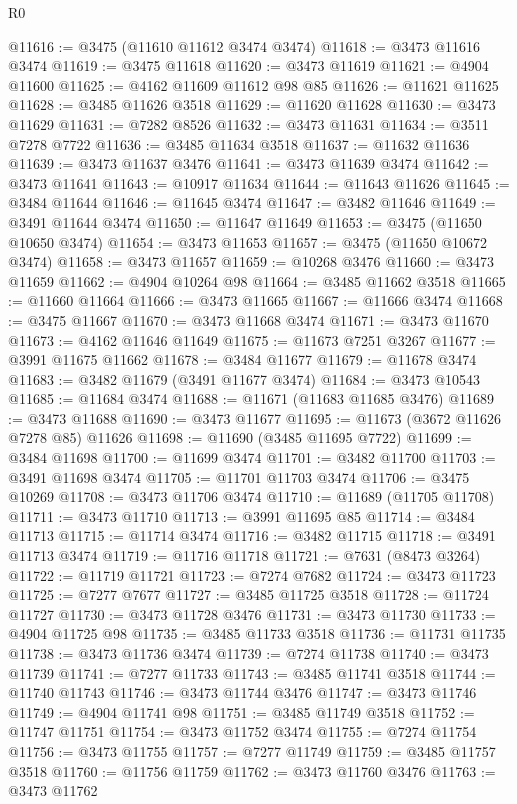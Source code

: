 \begin{lexlean}{R0}
\begin{coremodule}
@11616 := @3475 (@11610 @11612 @3474 @3474)
@11618 := @3473 @11616 @3474
@11619 := @3475 @11618
@11620 := @3473 @11619
@11621 := @4904 @11600
@11625 := @4162 @11609 @11612 @98 @85
@11626 := @11621 @11625
@11628 := @3485 @11626 @3518
@11629 := @11620 @11628
@11630 := @3473 @11629
@11631 := @7282 @8526
@11632 := @3473 @11631
@11634 := @3511 @7278 @7722
@11636 := @3485 @11634 @3518
@11637 := @11632 @11636
@11639 := @3473 @11637 @3476
@11641 := @3473 @11639 @3474
@11642 := @3473 @11641
@11643 := @10917 @11634
@11644 := @11643 @11626
@11645 := @3484 @11644
@11646 := @11645 @3474
@11647 := @3482 @11646
@11649 := @3491 @11644 @3474
@11650 := @11647 @11649
@11653 := @3475 (@11650 @10650 @3474)
@11654 := @3473 @11653
@11657 := @3475 (@11650 @10672 @3474)
@11658 := @3473 @11657
@11659 := @10268 @3476
@11660 := @3473 @11659
@11662 := @4904 @10264 @98
@11664 := @3485 @11662 @3518
@11665 := @11660 @11664
@11666 := @3473 @11665
@11667 := @11666 @3474
@11668 := @3475 @11667
@11670 := @3473 @11668 @3474
@11671 := @3473 @11670
@11673 := @4162 @11646 @11649
@11675 := @11673 @7251 @3267
@11677 := @3991 @11675 @11662
@11678 := @3484 @11677
@11679 := @11678 @3474
@11683 := @3482 @11679 (@3491 @11677 @3474)
@11684 := @3473 @10543
@11685 := @11684 @3474
@11688 := @11671 (@11683 @11685 @3476)
@11689 := @3473 @11688
@11690 := @3473 @11677
@11695 := @11673 (@3672 @11626 @7278 @85) @11626
@11698 := @11690 (@3485 @11695 @7722)
@11699 := @3484 @11698
@11700 := @11699 @3474
@11701 := @3482 @11700
@11703 := @3491 @11698 @3474
@11705 := @11701 @11703 @3474
@11706 := @3475 @10269
@11708 := @3473 @11706 @3474
@11710 := @11689 (@11705 @11708)
@11711 := @3473 @11710
@11713 := @3991 @11695 @85
@11714 := @3484 @11713
@11715 := @11714 @3474
@11716 := @3482 @11715
@11718 := @3491 @11713 @3474
@11719 := @11716 @11718
@11721 := @7631 (@8473 @3264)
@11722 := @11719 @11721
@11723 := @7274 @7682
@11724 := @3473 @11723
@11725 := @7277 @7677
@11727 := @3485 @11725 @3518
@11728 := @11724 @11727
@11730 := @3473 @11728 @3476
@11731 := @3473 @11730
@11733 := @4904 @11725 @98
@11735 := @3485 @11733 @3518
@11736 := @11731 @11735
@11738 := @3473 @11736 @3474
@11739 := @7274 @11738
@11740 := @3473 @11739
@11741 := @7277 @11733
@11743 := @3485 @11741 @3518
@11744 := @11740 @11743
@11746 := @3473 @11744 @3476
@11747 := @3473 @11746
@11749 := @4904 @11741 @98
@11751 := @3485 @11749 @3518
@11752 := @11747 @11751
@11754 := @3473 @11752 @3474
@11755 := @7274 @11754
@11756 := @3473 @11755
@11757 := @7277 @11749
@11759 := @3485 @11757 @3518
@11760 := @11756 @11759
@11762 := @3473 @11760 @3476
@11763 := @3473 @11762

\end{coremodule}
\end{lexlean}
